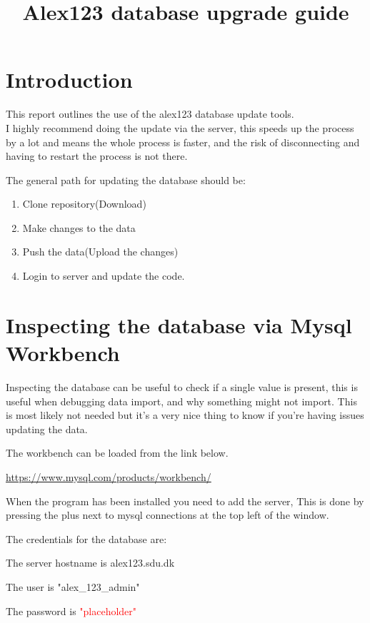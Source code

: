 \documentclass[a4paper,10pt,titlepage]{report}
\date{}
\title{Alex123 database upgrade guide}
\begin{document}
\section{Introduction}

This report outlines the use of the alex123 database update tools.
\\

I highly recommend doing the update via the server, this speeds up the process by a lot and means the whole process is faster, and the risk of disconnecting and having to restart the process is not there.



The general path for updating the database should be:

\begin{enumerate}
\item Clone repository(Download)
\item Make changes to the data
\item Push the data(Upload the changes)
\item Login to server and update the code.
\end{enumerate}	

\newpage
\section{Inspecting the database via Mysql Workbench}

Inspecting the database can be useful to check if a single value is present, this is useful when debugging data import, and why something might not import. This is most likely not needed but it's a very nice thing to know if you're having issues updating the data.


The workbench can be loaded from the link below.

\url{https://www.mysql.com/products/workbench/}

When the program has been installed you need to add the server, This is done by pressing the plus next to mysql connections at the top left of the window.

\vspace{5mm}

The credentials for the database are:

The server hostname is alex123.sdu.dk

The user is "alex\_123\_admin"

The password is \textcolor{red}{"placeholder"}
\vspace{5mm}
\end{document}
